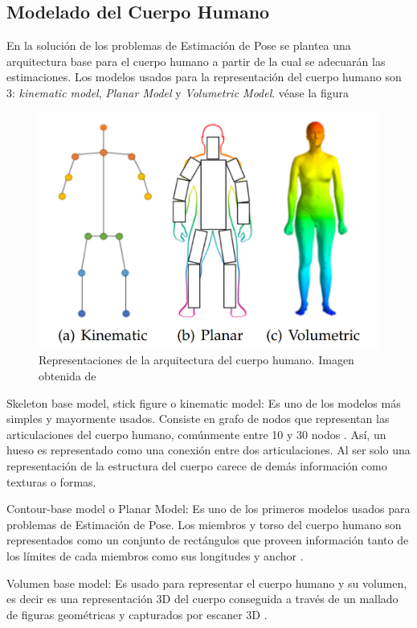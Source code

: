 \subsection{Modelado del Cuerpo Humano}

En la solución de los problemas de Estimación de Pose se plantea una arquitectura base para el
cuerpo humano a partir de la cual se adecuarán las estimaciones. Los modelos usados para la
representación del cuerpo humano son 3: \textit{kinematic model}, \textit{Planar Model} y
\textit{Volumetric Model}. véase la figura

\begin{figure}[ht!]
    \centering
    \includegraphics[width=0.7 \textwidth]{Chapters/1. HPE_LUNG/figures/body_model.png}
    \caption{Representaciones de la arquitectura del cuerpo humano. Imagen obtenida de \citeauthor{DBLP:journals/corr/FangXL16}}
    \label{fig:human_rep}
\end{figure}


Skeleton base model, stick figure o kinematic model:
Es uno de los modelos más simples y mayormente usados. Consiste en grafo de nodos que representan
las articulaciones del cuerpo humano, comúnmente entre 10 y 30 nodos \cite{Felzenszwalb2005}.
Así, un hueso es representado como una conexión entre dos articulaciones. Al ser solo una
representación de la estructura del cuerpo carece de demás información como texturas o formas.

Contour-base model o Planar Model:
Es uno de los primeros modelos usados para problemas de Estimación de Pose. Los miembros y torso del
cuerpo humano son representados como un conjunto de rectángulos que proveen información tanto de los
límites de cada miembros como sus longitudes y anchor \cite{557241} \cite{COOTES199538}.

Volumen base model:
Es usado para representar el cuerpo humano y su volumen, es decir es una representación 3D del
cuerpo conseguida a través de un mallado de figuras geométricas y capturados por escaner 3D
\cite{840661}.

